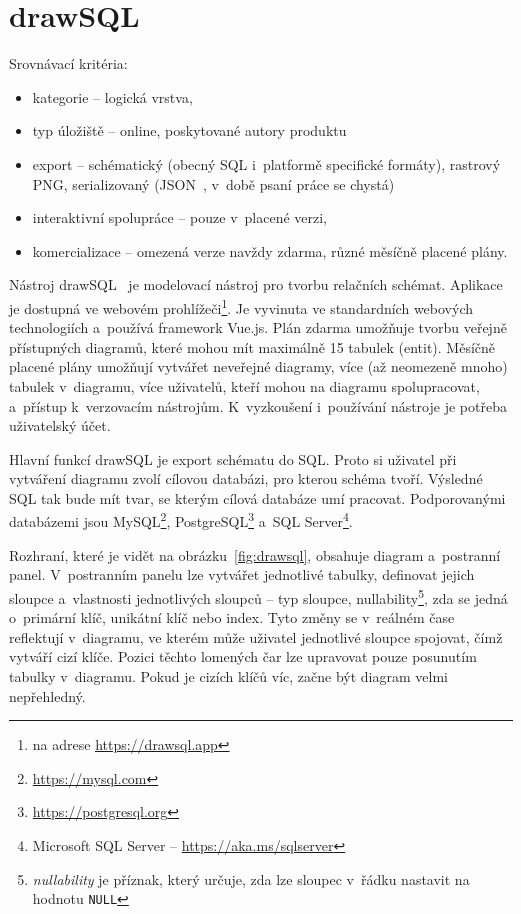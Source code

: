 \section{drawSQL}

Srovnávací kritéria:
\begin{itemize}
  \item kategorie -- logická vrstva,
  \item typ úložiště -- online, poskytované autory produktu
  \item export -- schématický (obecný SQL i~platformě specifické formáty), rastrový PNG, serializovaný (JSON~\cite{json2017}, v~době psaní práce se chystá)
  \item interaktivní spolupráce -- pouze v~placené verzi,
  \item komercializace -- omezená verze navždy zdarma, různé měsíčně placené plány.
\end{itemize}

Nástroj drawSQL~\cite{drawsql21} je modelovací nástroj pro tvorbu relačních schémat.
Aplikace je dostupná ve webovém prohlížeči\footnote{na adrese \url{https://drawsql.app}}.
Je vyvinuta ve standardních webových technologiích a~používá framework Vue.js.
Plán zdarma umožňuje tvorbu veřejně přístupných diagramů, které mohou mít maximálně 15 tabulek (entit).
Měsíčně placené plány umožňují vytvářet neveřejné diagramy, více (až neomezeně mnoho) tabulek v~diagramu, více uživatelů, kteří mohou na diagramu spolupracovat, a~přístup k~verzovacím nástrojům.
K~vyzkoušení i~používání nástroje je potřeba uživatelský účet.

Hlavní funkcí drawSQL je export schématu do SQL.
Proto si uživatel při vytváření diagramu zvolí cílovou databázi, pro kterou schéma tvoří.
Výsledné SQL tak bude mít tvar, se kterým cílová databáze umí pracovat.
Podporovanými databázemi jsou
MySQL\footnote{\url{https://mysql.com}},
PostgreSQL\footnote{\url{https://postgresql.org}}
a~SQL Server\footnote{Microsoft SQL Server -- \url{https://aka.ms/sqlserver}}.

Rozhraní, které je vidět na obrázku~\ref{fig:drawsql}, obsahuje diagram a~postranní panel.
V~postranním panelu lze vytvářet jednotlivé tabulky, definovat jejich sloupce a~vlastnosti jednotlivých sloupců -- typ sloupce,
nullability\footnote{\emph{nullability} je příznak, který určuje, zda lze sloupec v~řádku nastavit na hodnotu \texttt{NULL}},
zda se jedná o~primární klíč, unikátní klíč nebo index.
Tyto změny se v~reálném čase reflektují v~diagramu, ve kterém může uživatel jednotlivé sloupce spojovat, čímž vytváří cizí klíče.
Pozici těchto lomených čar lze upravovat pouze posunutím tabulky v~diagramu.
Pokud je cizích klíčů víc, začne být diagram velmi nepřehledný.

